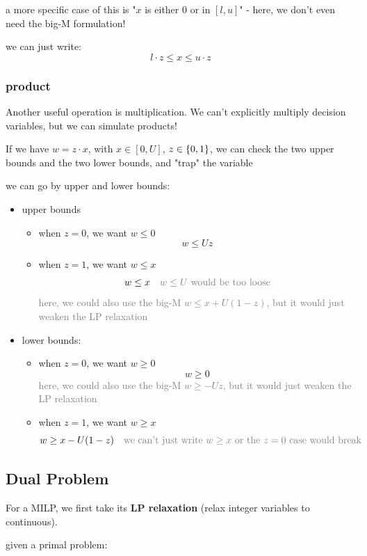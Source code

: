 \documentclass[a4paper, 11pt]{report}
\begin{document}
a more specific case of this is "$x$ is either $0$ or in $[l, u]$" - here, we don't even need the big-M formulation!

we can just write:
$$ l \cdot z \leq x \leq u \cdot z $$

\subsubsection*{product}
Another useful operation is multiplication. We can't explicitly multiply decision variables, but we can simulate products!

If we have $w = z \cdot x$, with $x \in [0, U]$, $z \in \set{0,1}$, we can check the two upper bounds and the two lower bounds, and "trap" the variable

we can go by upper and lower bounds:
\begin{itemize}
    \item upper bounds
        \begin{itemize}
            \item when $z=0$, we want $w \leq 0$
        $$  w \leq U z $$
    \item when $z = 1$, we want $w \leq x$
        $$ w \leq x \quad \textcolor{gray}{w \leq U \text{ would be too loose}} $$
    \subitem \textcolor{gray}{here, we could also use the big-M $w \leq x + U(1-z)$, but it would just weaken the LP relaxation}
        \end{itemize}
    \item lower bounds:
        \begin{itemize}
            \item when $z = 0$, we want $w \geq 0$
                $$ w \geq 0 $$
    \subitem \textcolor{gray}{here, we could also use the big-M $w \geq -U z$, but it would just weaken the LP relaxation}
            \item when $z = 1$, we want $w \geq x$
                $$ w \geq x - U (1-z) \quad \textcolor {gray}{\text{we can't just write } w \geq x \text{ or the } z =0 \text{ case would break}}$$
        \end{itemize}
\end{itemize}

\subsection{Dual Problem}
For a MILP, we first take its \textbf{LP relaxation} (relax integer variables to continuous).

\medskip
\noindent given a primal problem:
\end{document}
